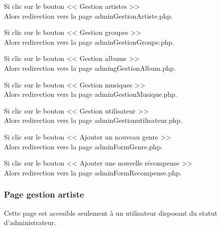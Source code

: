 
			\begin{paragraphe}
				Si clic sur le bouton << Gestion artistes >> \\
				Alors redirection vers la page adminGestionArtiste.php.
			\end{paragraphe}

			\begin{paragraphe}
				Si clic sur le bouton << Gestion groupes >> \\
				Alors redirection vers la page adminGestionGroupe.php.
			\end{paragraphe}

			\begin{paragraphe}
				Si clic sur le bouton << Gestion albums >> \\
				Alors redirection vers la page admingGestionAlbum.php.
			\end{paragraphe}

			\begin{paragraphe}
				Si clic sur le bouton << Gestion musiques >> \\
				Alors redirection vers la page adminGestionMusique.php.
			\end{paragraphe}

			\begin{paragraphe}
				Si clic sur le bouton << Gestion utilisateur >> \\
				Alors redirection vers la page adminGestionutilisateur.php.
			\end{paragraphe}

			\begin{paragraphe}
				Si clic sur le bouton << Ajouter un nouveau genre >> \\
				Alors redirection vers la page adminFormGenre.php.
			\end{paragraphe}

			\begin{paragraphe}
				Si clic sur le bouton << Ajouter une nouvelle récompense >> \\
				Alors redirection vers la page adminFormRecompense.php.
			\end{paragraphe}

		\subsubsection{Page gestion artiste}

			\begin{paragraphe}
				Cette page est accesible seulement à un utilisateur disposant du statut d'administrateur.
			\end{paragraphe}


